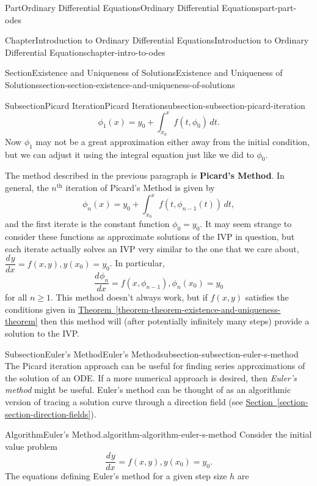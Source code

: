 \documentclass[twoside,10pt,]{book}
\newcommand{\xreffont}{\relax}
\newcommand{\terminology}[1]{\textbf{#1}}
\numberwithin{equation}{part}
\newcommand{\dv}[3][]{\dfrac{d^{#1} #2}{d #3^{#1}}}
\begin{document}
\begin{partptx}{Part}{Ordinary Differential Equations}{}{Ordinary Differential Equations}{}{}{part-part-odes}
\begin{chapterptx}{Chapter}{Introduction to Ordinary Differential Equations}{}{Introduction to Ordinary Differential Equations}{}{}{chapter-intro-to-odes}
\begin{sectionptx}{Section}{Existence and Uniqueness of Solutions}{}{Existence and Uniqueness of Solutions}{}{}{section-section-existence-and-uniqueness-of-solutions}
\begin{subsectionptx}{Subsection}{Picard Iteration}{}{Picard Iteration}{}{}{subsection-subsection-picard-iteration}
\begin{equation*}
\phi_{1}(x) = y_{0} + \int_{x_{0}}^{x}f(t,\phi_{0})\,dt.
\end{equation*}
Now \(\phi_{1}\) may not be a great approximation either away from the initial condition, but we can adjust it using the integral equation just like we did to \(\phi_{0}\).%
\par
The method described in the previous paragraph is \terminology{Picard's Method}. In general, the \(n^{\text{th}}\) iteration of Picard's Method is given by%
\begin{equation*}
\phi_{n}(x) = y_{0}+\int_{x_{0}}^{x}f(t,\phi_{n-1}(t))\,dt,
\end{equation*}
and the first iterate is the constant function \(\phi_{0} = y_{0}.\) It may seem strange to consider these functions as approximate solutions of the IVP in question, but each iterate actually solves an IVP very similar to the one that we care about, \(\dv{y}{x} = f(x,y), y(x_{0}) = y_{0}\). In particular,%
\begin{equation*}
\dv{\phi_{n}}{x} = f(x,\phi_{n-1}), \phi_{n}(x_{0}) = y_{0}
\end{equation*}
for all \(n\geq1\). This method doesn't always work, but if \(f(x,y)\) satisfies the conditions given in \hyperref[theorem-theorem-existence-and-uniqueness-theorem]{Theorem~{\xreffont\ref{theorem-theorem-existence-and-uniqueness-theorem}}} then this method will (after potentially infinitely many steps) provide a solution to the IVP.%
\end{subsectionptx}
%
%
\typeout{************************************************}
\typeout{************************************************}
%
\begin{subsectionptx}{Subsection}{Euler's Method}{}{Euler's Method}{}{}{subsection-subsection-euler-s-method}
The Picard iteration approach can be useful for finding series approximations of the solution of an ODE. If a more numerical approach is desired, then \emph{Euler's method} might be useful. Euler's method can be thought of as an algorithmic version of tracing a solution curve through a direction field (see \hyperref[section-section-direction-fields]{Section~{\xreffont\ref{section-section-direction-fields}}}).%
\begin{algorithm}{Algorithm}{Euler's Method.}{}{algorithm-algorithm-euler-s-method}%
Consider the initial value problem%
\begin{equation*}
\dv{y}{x} = f(x, y), y(x_0) = y_0.
\end{equation*}
The equations defining Euler's method for a given step size \(h\) are%

\end{algorithm}
\end{subsectionptx}
\end{sectionptx}
\end{chapterptx}
\end{partptx}
\end{document}
